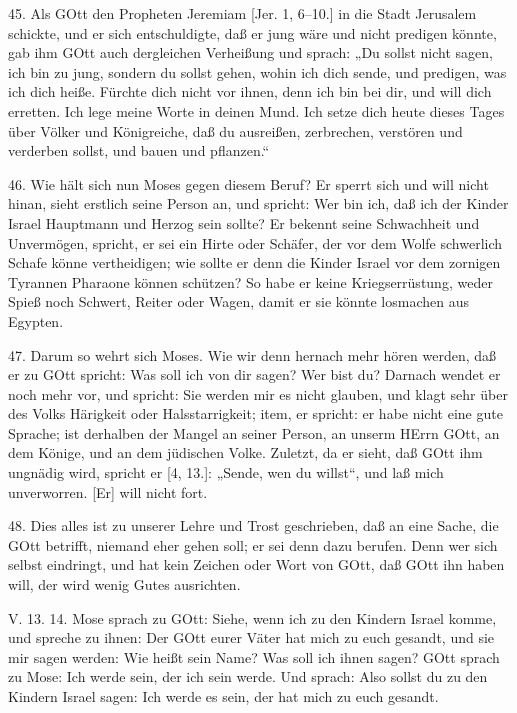 45. Als GOtt den Propheten Jeremiam [Jer. 1, 6–10.] in die Stadt Jerusalem schickte, und er sich entschuldigte, daß er jung wäre und nicht predigen könnte, gab ihm GOtt auch dergleichen
Verheißung und sprach: „Du sollst nicht sagen, ich bin zu jung, sondern du sollst gehen, wohin ich dich sende, und predigen, was ich dich heiße. Fürchte dich nicht vor ihnen, denn ich bin bei dir, und will dich erretten. Ich lege meine Worte in deinen Mund. Ich setze dich heute dieses Tages über Völker und Königreiche, daß du ausreißen, zerbrechen, verstören und verderben sollst, und bauen und pflanzen.“

46. Wie hält sich nun Moses gegen diesem Beruf? Er sperrt sich und will nicht hinan, sieht erstlich seine Person an, und spricht: Wer bin ich, daß ich der Kinder Israel Hauptmann und Herzog sein sollte? Er bekennt seine Schwachheit und Unvermögen, spricht, er sei ein Hirte oder Schäfer, der vor dem Wolfe schwerlich Schafe könne vertheidigen; wie sollte er denn die Kinder Israel vor dem zornigen Tyrannen Pharaone können schützen? So habe er keine Kriegserrüstung, weder Spieß noch Schwert, Reiter oder Wagen, damit er sie könnte losmachen aus Egypten.

47. Darum so wehrt sich Moses. Wie wir denn hernach mehr hören werden, daß er zu GOtt spricht: Was soll ich von dir sagen? Wer bist du? Darnach wendet er noch mehr vor, und spricht: Sie werden mir es nicht glauben, und klagt sehr über des Volks Härigkeit oder Halsstarrigkeit; item, er spricht: er habe nicht eine gute Sprache; ist derhalben der Mangel an seiner Person, an unserm HErrn GOtt, an dem Könige, und an dem jüdischen Volke. Zuletzt, da er sieht, daß GOtt ihm ungnädig wird, spricht er [4, 13.]: „Sende, wen du willst“, und laß mich unverworren. [Er] will nicht fort.

48. Dies alles ist zu unserer Lehre und Trost geschrieben, daß an eine Sache, die GOtt betrifft, niemand eher gehen soll; er sei denn dazu berufen. Denn wer sich selbst eindringt, und hat kein Zeichen oder Wort von GOtt, daß GOtt ihn haben will, der wird wenig Gutes ausrichten.

\begin{schriftzitat}
V. 13. 14. Mose sprach zu GOtt: Siehe, wenn ich zu den Kindern Israel komme, und spreche zu ihnen: Der GOtt eurer Väter hat mich zu euch gesandt, und sie mir sagen werden: Wie heißt sein Name? Was soll ich ihnen sagen? GOtt sprach zu Mose: Ich werde sein, der ich sein werde. Und sprach: Also sollst du zu den Kindern Israel sagen: Ich werde es sein, der hat mich zu euch gesandt.
\end{schriftzitat}

